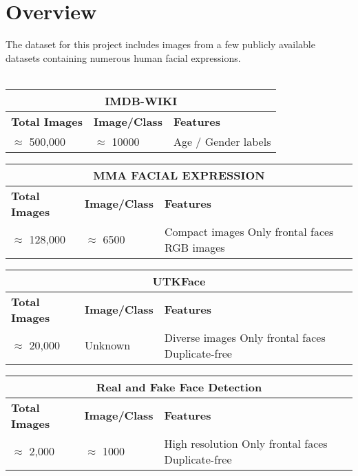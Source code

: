 \section{Overview}
    \noindent The dataset for this project includes images from a few publicly available datasets containing numerous human facial expressions.\\\\
\vspace*{1em}

\begin{tabular}{ |p{3cm}||p{3cm} ||p{3cm} | }
    \hline
    \multicolumn{3}{|c|}{\textbf{IMDB-WIKI}} \\
    \hline
    \textbf{Total Images} & \textbf{Image/Class } & \textbf{Features}\\
    \hline
    $\approx$ 500,000 & $\approx$ 10000 & Age / Gender labels\\
    \hline
\end{tabular}

\vspace*{1em}

\begin{tabular}{ |p{3cm}||p{3cm} ||p{3cm} | }
    \hline
    \multicolumn{3}{|c|}{\textbf{MMA FACIAL EXPRESSION}} \\
    \hline
    \textbf{Total Images} & \textbf{Image/Class } & \textbf{Features}\\
    \hline
    $\approx$ 128,000 & $\approx$ 6500 & Compact images Only frontal faces RGB images\\
    \hline
\end{tabular}
\vspace*{1em}

\begin{tabular}{ |p{3cm}||p{3cm} ||p{3cm} | }
    \hline
    \multicolumn{3}{|c|}{\textbf{UTKFace}} \\
    \hline
    \textbf{Total Images} & \textbf{Image/Class } & \textbf{Features}\\
    \hline
    $\approx$ 20,000 & Unknown & Diverse images Only frontal faces Duplicate-free\\
    \hline
\end{tabular}
\vspace*{1em}

\begin{tabular}{ |p{3cm}||p{3cm} ||p{3cm} | }
    \hline
    \multicolumn{3}{|c|}{\textbf{Real and Fake Face Detection}} \\
    \hline
    \textbf{Total Images} & \textbf{Image/Class } & \textbf{Features}\\
    \hline
    $\approx$ 2,000 & $\approx$ 1000 & High resolution Only frontal faces Duplicate-free\\
    \hline
\end{tabular}
\vspace*{1em}

